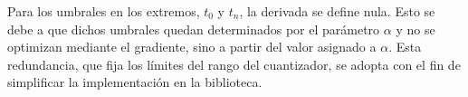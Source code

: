 Para los umbrales en los extremos, $t_0$ y $t_n$, la derivada se define nula. Esto se debe a que dichos umbrales quedan determinados por el parámetro $\alpha$ y no se optimizan mediante el gradiente, sino a partir del valor asignado a $\alpha$. Esta redundancia, que fija los límites del rango del cuantizador, se adopta con el fin de simplificar la implementación en la biblioteca.



